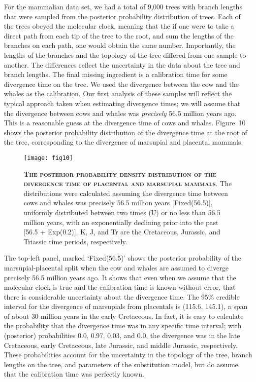 \documentclass{svmult}
\begin{document}
For the mammalian data set, we had a total of 9,000 trees with branch lengths that were sampled from the posterior probability distribution of trees. Each of the trees obeyed
the molecular clock, meaning that the if one were to take a direct path from each tip of the tree to the root, and sum the lengths of the branches on each path, one would
obtain the same number. Importantly, the lengths of the branches and the topology of the tree differed from one sample to another. The differences reflect the uncertainty
in the data about the tree and branch lengths. The final missing ingredient is a calibration time for some divergence time on the tree. We used the divergence between
the cow and the whales as the calibration. Our first analysis of these samples will reflect the typical approach taken when estimating divergence times; we will assume
that the divergence between cows and whales was {\it precisely} 56.5 million years ago. This is a reasonable guess at the divergence time of cows and whales. Figure~10
shows the posterior probability distribution of the divergence time at the root of the tree, corresponding to the divergence of marsupial and placental mammals. 
\begin{figure}[t]
\centering
\texttt{[image: fig10]}
\caption{\textbf{\textsc{The posterior probability density distribution of the divergence time of placental and marsupial mammals}}.
The distributions were calculated assuming the divergence time between cows and whales was precisely 56.5 million years [Fixed(56.5)], uniformly
distributed between two times (U) or no less than 56.5 million years, with an exponentially declining prior into the past [56.5 + Exp(0.2)]. K, J, and Tr are the Cretaceous,
Jurassic, and Triassic time periods, respectively.}
\label{fig10}
\end{figure}
The top-left panel, marked `Fixed(56.5)' shows the posterior probability of the marsupial-placental split when the cow and whales are assumed to diverge precisely 56.5 million
years ago. It shows that even when we assume that the molecular clock is true and the calibration time is known without error, that there is considerable uncertainty about
the divergence time. The 95\% credible interval for the divergence of marsupials from placentals is (115.6, 145.1), a span of about 30 million years in the early Cretaceous.
In fact, it is easy to calculate the probability that the divergence time was in any specific time interval; with (posterior) probabilities 0.0, 0.97, 0.03, and 0.0, the divergence was
in the late Cretaceous, early Cretaceous, late Jurassic, and middle Jurassic, respectively. These probabilities account for the uncertainty in the topology of the tree, branch lengths
on the tree, and parameters of the substitution model, but do assume that the calibration time was perfectly known.
\end{document}
